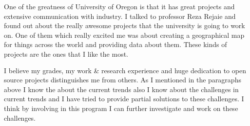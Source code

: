 \documentclass[11pt,a4paper,sans]{moderncv}        %
\begin{document}
One of the greatness of University of Oregon is that it has great projects and extensive communication
with industry. I talked to professor Reza Rejaie and found out about the really awesome projects
that the university is going to work on. One of them which really excited me was about creating a
geographical map for things across the world and providing data about them. These kinds of projects
are the ones that I like the most. 

I believe my grades, my work \& research experience and huge dedication
to open source projects distinguishes me from others. As I mentioned in the
paragraphs above I know the about the current trends also I know about the
challenges in current trends and I have tried to provide partial solutions
to these challenges. I think by involving in this program I can further
investigate and work on these challenges.

\makeletterclosing
\end{document}
